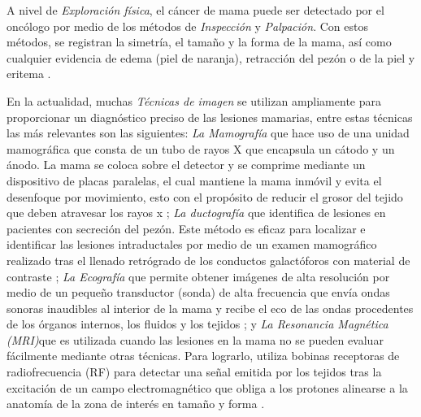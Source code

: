 A nivel de \textit{Exploración física}, el cáncer de mama puede ser detectado por el oncólogo por medio de los métodos de \textit{Inspección} y \textit{Palpación}. Con estos métodos, se registran la simetría, el tamaño y la forma de la mama, así como cualquier evidencia de edema (piel de naranja), retracción del pezón o de la piel y eritema .

En la actualidad, muchas \textit{Técnicas de imagen} se utilizan ampliamente para proporcionar un diagnóstico preciso de las lesiones mamarias\cite{Tamam2021}, entre estas técnicas las más relevantes son las siguientes: \textit{La Mamografía} que hace uso de una unidad mamográfica que consta de un tubo de rayos X que encapsula un cátodo y un ánodo. La mama se coloca sobre el detector y se comprime mediante un dispositivo de placas paralelas, el cual mantiene la mama inmóvil y evita el desenfoque por movimiento, esto con el propósito de reducir el grosor del tejido que deben atravesar los rayos x \cite{Ebrahimi2019}; \textit{La ductografía} que identifica de lesiones en pacientes con secreción del pezón. Este método es eficaz para localizar e identificar las lesiones intraductales por medio de un examen mamográfico realizado tras el llenado retrógrado de los conductos galactóforos con material de contraste \cite{Hirose2007}; \textit{La Ecografía} que permite obtener imágenes de alta resolución por medio de un pequeño transductor (sonda) de alta frecuencia que envía ondas sonoras inaudibles al interior de la mama y recibe el eco de las ondas procedentes de los órganos internos, los fluidos y los tejidos \cite{Hasan2019}; y \textit{La Resonancia Magnética (MRI)}que es utilizada cuando las lesiones en la mama no se pueden evaluar fácilmente mediante otras técnicas. Para lograrlo, utiliza bobinas receptoras de radiofrecuencia (RF) para detectar una señal emitida por los tejidos tras la excitación de un campo electromagnético que obliga a los protones alinearse a la anatomía de la zona de interés en tamaño y forma \cite{Tse2014}.

